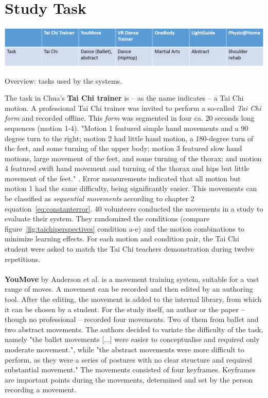 \section{Study Task}
\begin{table}[h]
	\centering
	\includegraphics[width=1.0\textwidth]{img/tbl2.png}
	\caption{Overview: tasks used by the systems.}
	\label{fig:tbl2}
\end{table}
The task in Chua's \cite{Chua2003} \textbf{Tai Chi trainer} is \--- as the name indicates \--- a Tai Chi motion. A professional Tai Chi trainer was invited to perform a so-called \textit{Tai Chi form} and recorded offline. This \textit{form} was segmented in four ca. 20 seconds long sequences (motion 1-4). "Motion 1 featured simple hand movements and a 90 degree turn to the right; motion 2 had little hand motion, a 180-degree turn of the feet, and some turning of the upper body; motion 3 featured slow hand motions, large movement of the feet, and some turning of the thorax; and motion 4 featured swift hand movement and turning of the thorax and hips but little movement of the feet." \cite{Chua2003}. Error measurements indicated that all motion but motion 1 had the same difficulty, being significantly easier. This movements can be classified as \textit{sequential movements} according to chapter 2 equation~\ref{eq:constanterror}. 40 volunteers conducted the movements in a study to evaluate their system. They randomized the conditions (compare figure~\ref{fig:taichiperspectives} condition a-e) and the motion combinations to minimize learning effects. For each motion and condition pair, the Tai Chi student were asked to match the Tai Chi teachers demonstration during twelve repetitions.\\ \\
\textbf{YouMove} by Anderson et al. \cite{Anderson2013a} is a movement training system, suitable for a vast range of moves. A movement can be recorded and then edited by an authoring tool. After the editing, the movement is added to the internal library, from which it can be chosen by a student. For the study itself, an author or the paper \--- though no professional \--- recorded four movements. Two of them from ballet and two abstract movements. The authors decided to variate the difficulty of the task, namely "the ballet movements [...] were easier to conceptualise and required only moderate movement.", while "the abstract movements were more difficult to perform, as they were a series of postures with no clear structure and required substantial movement." The movements consisted of four keyframes. Keyframes are important points during the movements, determined and set by the person recording a movement.\\ \\

